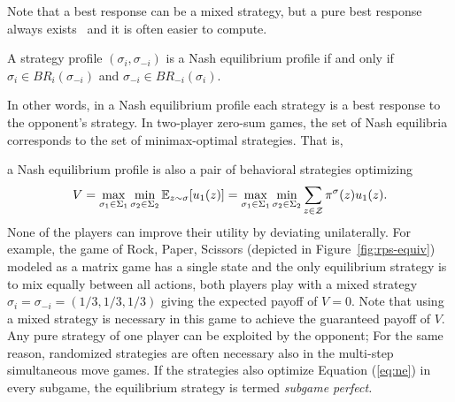 {Note that a best response can be a mixed strategy, but a pure best response always exists~\cite{Gintis09} and it is often easier to compute.

\begin{definition}
A strategy profile $(\sigma_i, \sigma_{-i})$ is a Nash equilibrium profile if and only if $\sigma_i \in BR_i(\sigma_{-i})$
and $\sigma_{-i} \in BR_{-i}(\sigma_i)$.
\end{definition}

In other words, in a Nash equilibrium profile each strategy is a best response to the opponent's strategy. In two-player zero-sum
games, the set of Nash equilibria corresponds to the set of minimax-optimal strategies. That is,} a Nash equilibrium profile is
also a pair of behavioral strategies optimizing
\begin{equation}\label{eq:ne}
V = \max_{\sigma_1 \in \Sigma_1} \min_{\sigma_2 \in \Sigma_2} \mathbb{E}_{z \sim \sigma}[u_1(z)]
  = \max_{\sigma_1 \in \Sigma_1} \min_{\sigma_2 \in \Sigma_2} \sum_{z \in \mathcal{Z}} \pi^\sigma(z) u_1(z).
\end{equation}
None of the players can improve their utility by deviating unilaterally.
For example, the game of Rock, Paper, Scissors (depicted in Figure~\ref{fig:rps-equiv}) modeled as a matrix game has a single state and the only equilibrium strategy is to mix equally between
all actions, \ie both players play with a mixed strategy $\sigma_i = \sigma_{-i} = (1/3, 1/3, 1/3)$ giving the expected payoff of
$V = 0$.
Note that using a mixed strategy is necessary in this game to achieve the guaranteed payoff of $V$.
Any pure strategy of one player can be exploited by the opponent; 
For the same reason, randomized strategies are often necessary also in the multi-step simultaneous move games.
If the strategies also optimize Equation (\ref{eq:ne}) in every subgame, the equilibrium strategy
is termed {\it subgame perfect.}

